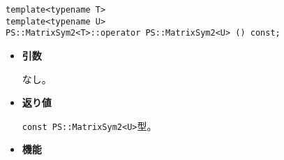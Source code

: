 
\begin{screen}
\begin{verbatim}
template<typename T>
template<typename U>
PS::MatrixSym2<T>::operator PS::MatrixSym2<U> () const;
\end{verbatim}
\end{screen}

\begin{itemize}

\item{{\bf 引数}}

  なし。

\item{{\bf 返り値}}

{\tt const PS::MatrixSym2<U>}型。

\item{{\bf 機能}}


\end{itemize}

